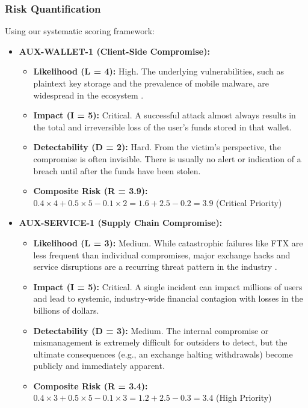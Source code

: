 \subsubsection{Risk Quantification}

Using our systematic scoring framework:

\begin{itemize}
    \item \textbf{AUX-WALLET-1 (Client-Side Compromise):}
    \begin{itemize}
        \item \textbf{Likelihood (L = 4):} High. The underlying vulnerabilities, such as plaintext key storage and the prevalence of mobile malware, are widespread in the ecosystem \cite{houy2023}.
        \item \textbf{Impact (I = 5):} Critical. A successful attack almost always results in the total and irreversible loss of the user's funds stored in that wallet.
        \item \textbf{Detectability (D = 2):} Hard. From the victim's perspective, the compromise is often invisible. There is usually no alert or indication of a breach until after the funds have been stolen.
        \item \textbf{Composite Risk (R = 3.9):} $0.4 \times 4 + 0.5 \times 5 - 0.1 \times 2 = 1.6 + 2.5 - 0.2 = 3.9$ (Critical Priority)
    \end{itemize}
    
    \item \textbf{AUX-SERVICE-1 (Supply Chain Compromise):}
    \begin{itemize}
        \item \textbf{Likelihood (L = 3):} Medium. While catastrophic failures like FTX are less frequent than individual compromises, major exchange hacks and service disruptions are a recurring threat pattern in the industry \cite{houy2023}.
        \item \textbf{Impact (I = 5):} Critical. A single incident can impact millions of users and lead to systemic, industry-wide financial contagion with losses in the billions of dollars.
        \item \textbf{Detectability (D = 3):} Medium. The internal compromise or mismanagement is extremely difficult for outsiders to detect, but the ultimate consequences (e.g., an exchange halting withdrawals) become publicly and immediately apparent.
        \item \textbf{Composite Risk (R = 3.4):} $0.4 \times 3 + 0.5 \times 5 - 0.1 \times 3 = 1.2 + 2.5 - 0.3 = 3.4$ (High Priority)
    \end{itemize}
\end{itemize}